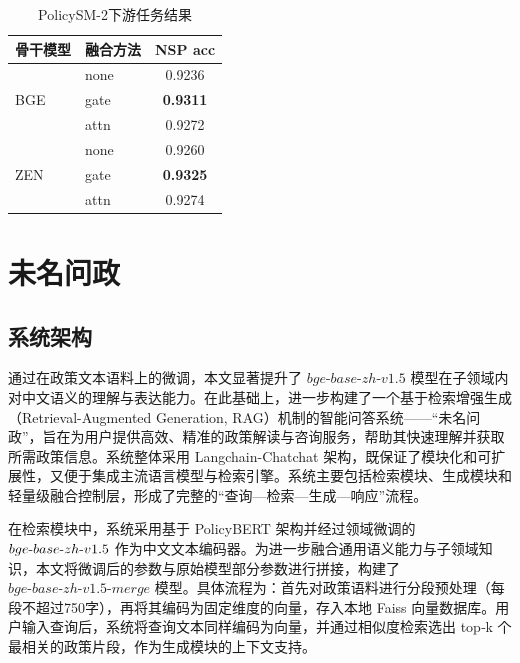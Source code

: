 \documentclass[12pt, a4paper]{ctexart}
\begin{document}
  \begin{table}[htbp]
    \renewcommand{\arraystretch}{1}
    \centering
    \caption{PolicySM-2下游任务结果}
    \begin{tabular}{llc}
      \toprule
      骨干模型 & 融合方法 & NSP acc \\
      \midrule
      \multirow{3}{*}{BGE}
        & none & 0.9236 \\
        & gate & \textbf{0.9311} \\
        & attn & 0.9272 \\
      \midrule
      \multirow{3}{*}{ZEN}
        & none & 0.9260 \\
        & gate & \textbf{0.9325} \\
        & attn & 0.9274 \\
      \bottomrule
    \end{tabular}
    \label{tab:nsp-results}
  \end{table}

\newpage
\section{未名问政}

\subsection{系统架构}

通过在政策文本语料上的微调，本文显著提升了 $bge\text{-}base\text{-}zh\text{-}v1.5$ 模型在子领域内对中文语义的理解与表达能力。在此基础上，进一步构建了一个基于检索增强生成（Retrieval-Augmented Generation, RAG）机制的智能问答系统——“未名问政”，旨在为用户提供高效、精准的政策解读与咨询服务，帮助其快速理解并获取所需政策信息。系统整体采用 Langchain-Chatchat 架构，既保证了模块化和可扩展性，又便于集成主流语言模型与检索引擎。系统主要包括检索模块、生成模块和轻量级融合控制层，形成了完整的“查询—检索—生成—响应”流程。

在检索模块中，系统采用基于 PolicyBERT 架构并经过领域微调的 $bge\text{-}base\text{-}\\zh\text{-}v1.5$ 作为中文文本编码器。为进一步融合通用语义能力与子领域知识，本文将微调后的参数与原始模型部分参数进行拼接，构建了 $bge\text{-}base\text{-}zh\text{-}v1.5\text{-}merge$ 模型。具体流程为：首先对政策语料进行分段预处理（每段不超过750字），再将其编码为固定维度的向量，存入本地 Faiss 向量数据库。用户输入查询后，系统将查询文本同样编码为向量，并通过相似度检索选出 top‑k 个最相关的政策片段，作为生成模块的上下文支持。
\end{document}
